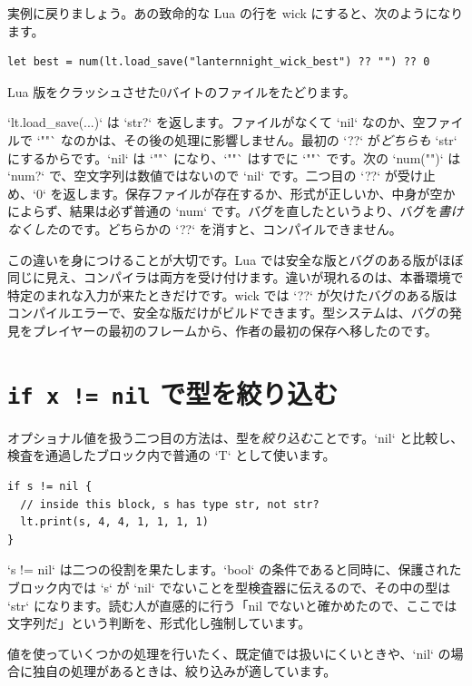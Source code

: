 実例に戻りましょう。あの致命的な Lua の行を wick にすると、次のようになります。

\begin{lstlisting}[language=wick]
let best = num(lt.load_save("lanternnight_wick_best") ?? "") ?? 0
\end{lstlisting}

\noindent
Lua 版をクラッシュさせた0バイトのファイルをたどります。

`lt.load_save(...)` は `str?` を返します。ファイルがなくて `nil` なのか、空ファイルで `""` なのかは、その後の処理に影響しません。最初の `??` が\emph{どちらも} `str` にするからです。`nil` は `""` になり、`""` はすでに `""` です。次の `num("")` は `num?` で、空文字列は数値ではないので `nil` です。二つ目の `??` が受け止め、`0` を返します。保存ファイルが存在するか、形式が正しいか、中身が空かによらず、結果は必ず普通の `num` です。バグを直したというより、バグを\emph{書けなくした}のです。どちらかの `??` を消すと、コンパイルできません。

この違いを身につけることが大切です。Lua では安全な版とバグのある版がほぼ同じに見え、コンパイラは両方を受け付けます。違いが現れるのは、本番環境で特定のまれな入力が来たときだけです。wick では `??` が欠けたバグのある版はコンパイルエラーで、安全な版だけがビルドできます。型システムは、バグの発見をプレイヤーの最初のフレームから、作者の最初の保存へ移したのです。

\section{\texttt{if x != nil} で型を絞り込む}

オプショナル値を扱う二つ目の方法は、型を\emph{絞り込む}ことです。`nil` と比較し、検査を通過したブロック内で普通の `T` として使います。

\begin{lstlisting}[language=wick]
if s != nil {
  // inside this block, s has type str, not str?
  lt.print(s, 4, 4, 1, 1, 1, 1)
}
\end{lstlisting}

\noindent
`s != nil` は二つの役割を果たします。`bool` の条件であると同時に、保護されたブロック内では `s` が `nil` でないことを型検査器に伝えるので、その中の型は `str` になります。読む人が直感的に行う「nil でないと確かめたので、ここでは文字列だ」という判断を、形式化し強制しています。

値を使っていくつかの処理を行いたく、既定値では扱いにくいときや、`nil` の場合に独自の処理があるときは、絞り込みが適しています。

